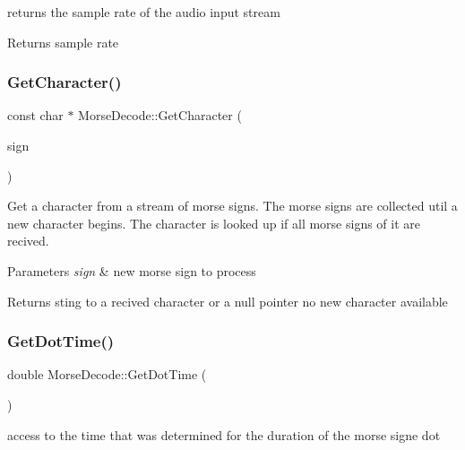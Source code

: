 returns the sample rate of the audio input stream 

\begin{DoxyReturn}{Returns}
sample rate 
\end{DoxyReturn}
\mbox{\label{classMorseDecode_a1d3c6ce0ee7c17c55e6ca102a4a6049a}} 
\subsubsection{\texorpdfstring{Get\+Character()}{GetCharacter()}}
{\footnotesize\ttfamily const char $\ast$ Morse\+Decode\+::\+Get\+Character (\begin{DoxyParamCaption}\item[{Morse\+::\+Morse\+Sign}]{sign }\end{DoxyParamCaption})}



Get a character from a stream of morse signs. The morse signs are collected util a new character begins. The character is looked up if all morse signs of it are recived. 


\begin{DoxyParams}{Parameters}
{\em sign} & new morse sign to process \\
\hline
\end{DoxyParams}
\begin{DoxyReturn}{Returns}
sting to a recived character or a null pointer no new character available 
\end{DoxyReturn}
\mbox{\label{classMorseDecode_a377a7a2c31260c045d472adc96662b85}} 
\subsubsection{\texorpdfstring{Get\+Dot\+Time()}{GetDotTime()}}
{\footnotesize\ttfamily double Morse\+Decode\+::\+Get\+Dot\+Time (\begin{DoxyParamCaption}{ }\end{DoxyParamCaption})}



access to the time that was determined for the duration of the morse signe dot 

